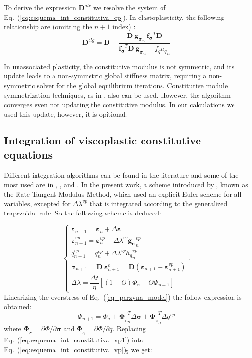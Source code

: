 \documentclass[Journal,letterpaper]{ascelike-new}
\newcommand{\dfds}{\boldsymbol{f_\sigma}}
\newcommand{\dfdq}{{f_q}}
\newcommand{\dgds}{\boldsymbol{g_\sigma}}
\newcommand{\dPhidsl}{\boldsymbol{\Phi_{_\sigma}}}
\newcommand{\dPhidql}{\boldsymbol{\Phi_{_q}}}
\newcommand{\Dsdee}{\boldsymbol{D}}
\newcommand{\hl}{{h_q}}
\newcommand{\strain}{\boldsymbol{\varepsilon}}
\newcommand{\stress}{\boldsymbol{\sigma}}
\begin{document}
To derive the expression $\Dsdee^{alg}$ we resolve the system of Eq.~(\ref{eq:esquema_int_constitutiva_ep}). In elastoplasticity, the following relationship are (omitting the $n+1$ index) \cite{belytschko2000}: 
\begin{equation}
	\label{eq:D_alg_ep}
	\Dsdee^{alg} = \Dsdee - \dfrac{\Dsdee~\dgds_n~\dfds^T \Dsdee}{\dfds^T\Dsdee~\dgds_n-\dfdq \hl_n}
\end{equation}

In unassociated plasticity, the constitutive modulus is not symmetric, and its update leads to a non-symmetric global stiffness matrix, requiring a non-symmetric solver for the global equilibrium iterations. Constitutive module symmetrization techniques, as in , also can be used. However, the algorithm converges even not updating the constitutive modulus. In our calculations we used this update, however, it is opitional.

\subsection{Integration of viscoplastic constitutive equations}

Different integration algorithms can be found in the literature and some of the most used are in , ,  and . In the present work, a scheme introduced by , known as the Rate Tangent Modulus Method, which used an explicit Euler scheme for all variables, excepted for $\Delta \lambda^{vp}$ that is integrated according to the generalized trapezoidal rule. So the following scheme is deduced:

\begin{equation}
	\label{eq:esquema_int_constitutiva_vp}
	\left\{
	\begin{array}{lcl}
		\strain_{n+1} = \strain_n + \Delta \strain \\
		\strain_{n+1}^{vp} = \strain_n^{vp} + \Delta \lambda^{vp} \dgds_n^{vp} \\
		q_{n+1}^{vp} = q_n^{vp} + \Delta \lambda^{vp} \hl_n^{vp} \\	
		\stress_{n+1} = \Dsdee~\strain_{n+1}^e = \Dsdee(\strain_{n+1} - \strain_{n+1}^{vp}) \\
		\Delta \lambda = \dfrac{\Delta t}{\eta}[(1-\Theta)\Phi_n + \Theta \Phi_{n+1}]
	\end{array}
	\right..
\end{equation}
Linearizing the overstress of Eq.~(\ref{eq_perzyna_model}) the follow expression is obtained:
\begin{equation}
	\label{eq:esquema_int_constitutiva_vp1}
	\Phi_{n+1} = \Phi_n + \dPhidsl_n^T \Delta \stress + \dPhidql_n^T \Delta q^{vp}
\end{equation}
where $\dPhidsl = \partial \Phi / \partial \stress$ and $\dPhidql = \partial \Phi / \partial q$. Replacing  Eq.~(\ref{eq:esquema_int_constitutiva_vp1}) into Eq.~(\ref{eq:esquema_int_constitutiva_vp})$_5$ we get:
\end{document}
